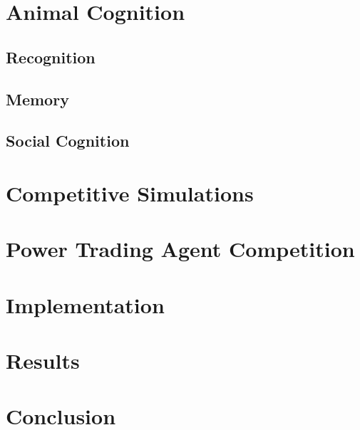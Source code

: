 \chapter{Animal Cognition}
\section{Recognition}
\section{Memory}
\section{Social Cognition}

\chapter{Competitive Simulations}%

\chapter{Power Trading Agent Competition}


\chapter{Implementation}


\chapter{Results}

\chapter{Conclusion}

